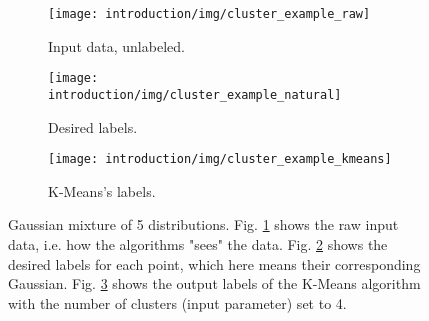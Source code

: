


\begin{figure}[!ht]
    \centering
    \begin{subfigure}[b]{0.3\textwidth}
        \centering
        \texttt{[image: introduction/img/cluster\_example\_raw]}
        \caption{Input data, unlabeled.}
        \label{fig:intro raw}
    \end{subfigure}
    \hfill
    \begin{subfigure}[b]{0.3\textwidth}
        \centering
        \texttt{[image: introduction/img/cluster\_example\_natural]}
        \caption{Desired labels.}
        \label{fig:intro natural}
    \end{subfigure}
    \hfill
    \begin{subfigure}[b]{0.3\textwidth}
        \centering
        \texttt{[image: introduction/img/cluster\_example\_kmeans]}
        \caption{K-Means's labels.}
        \label{fig:intro kmeans}
    \end{subfigure}
    \caption{Gaussian mixture of 5 distributions. Fig. \ref{fig:intro raw} shows the raw input data, i.e. how the algorithms "sees" the data. Fig. \ref{fig:intro natural} shows the desired labels for each point, which here means their corresponding Gaussian. Fig. \ref{fig:intro kmeans} shows the output labels of the K-Means algorithm with the number of clusters (input parameter) set to 4.}
    \label{fig:clustering plots}
\end{figure}


